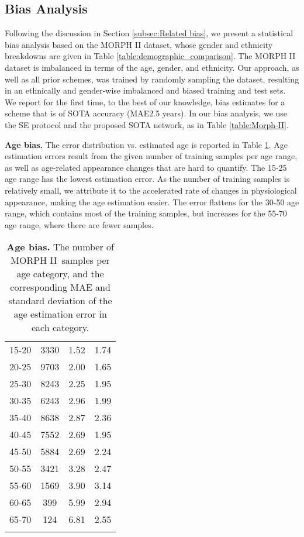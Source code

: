 \documentclass[10pt,journal]{IEEEtran}\usepackage{amsfonts}
\begin{document}
\subsection{Bias Analysis}

\label{subsec:bias}

Following the discussion in Section \ref{subsec:Related bias}, we present a
statistical bias analysis based on the MORPH II dataset, whose gender and
ethnicity breakdowns are given in Table \ref{table:demographic_comparison}.
The MORPH II dataset is imbalanced in terms of the age, gender, and ethnicity.
Our approach, as well as all prior schemes, was trained by randomly sampling
the dataset, resulting in an ethnically and gender-wise imbalanced and biased
training and test sets. We report for the first time, to the best of our
knowledge, bias estimates for a scheme that is of SOTA accuracy (MAE2.5 years). In our bias analysis, we use the SE protocol and the proposed
SOTA network, as in Table \ref{table:Morph-II}.

\vspace{2mm}\noindent\textbf{Age bias.} The error distribution vs. estimated
age is reported in Table \ref{table:morph2_count}. Age estimation errors
result from the given number of training samples per age range, as well as
age-related appearance changes that are hard to quantify. The 15-25 age range
has the lowest estimation error. As the number of training samples is
relatively small, we attribute it to the accelerated rate of changes in
physiological appearance, making the age estimation easier. The error flattens
for the 30-50 age range, which contains most of the training samples, but
increases for the 55-70 age range, where there are fewer
samples.\begin{table}[tbh]
\caption{\textbf{Age bias.} The number of MORPH II\ samples per age category,
and the corresponding MAE and standard deviation of the age estimation error
in each category.}\label{table:morph2_count}
\centering
\renewcommand{\arraystretch}{1.3}
\begin{tabular}
[c]{cccc}\toprule  &  &  &
\\
\midrule 15-20 & 3330 & 1.52 & 1.74\\
20-25 & 9703 & 2.00 & 1.65\\
25-30 & 8243 & 2.25 & 1.95\\
30-35 & 6243 & 2.96 & 1.99\\
35-40 & 8638 & 2.87 & 2.36\\
40-45 & 7552 & 2.69 & 1.95\\
45-50 & 5884 & 2.69 & 2.24\\
50-55 & 3421 & 3.28 & 2.47\\
55-60 & 1569 & 3.90 & 3.14\\
60-65 & 399 & 5.99 & 2.94\\
65-70 & 124 & 6.81 & 2.55\\
\bottomrule &  &  &
\end{tabular}
\end{table}
\end{document}

